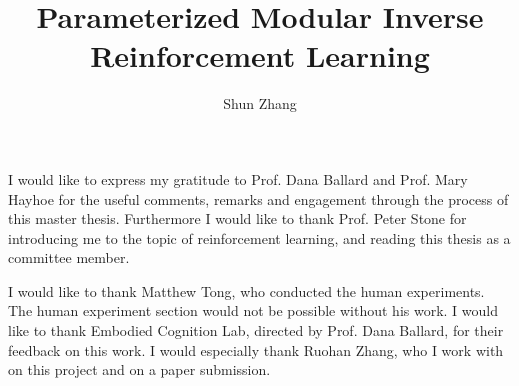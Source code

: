 \documentclass[12pt]{report}	%
\author{Shun Zhang}
\title{Parameterized Modular Inverse Reinforcement Learning}
\theoremstyle{definition}
\theoremstyle{remark}
\begin{document}
\copyrightpage          %


%
%
%
\titlepage              %

\commcertpage           %

%
\begin{acknowledgments}		%
%
I would like to express my gratitude to Prof. Dana Ballard and Prof. Mary Hayhoe
for the useful comments, remarks and engagement through the process of this
master thesis. Furthermore I would like to thank Prof. Peter Stone for
introducing me to the topic of reinforcement learning, and reading this thesis
as a committee member.

I would like to thank Matthew Tong, who conducted the human experiments. The
human experiment section would not be possible without his work. I would
like to thank Embodied Cognition Lab, directed by Prof. Dana Ballard, for their
feedback on this work. I would especially thank Ruohan Zhang, who I work with on
this project and on a paper submission.
\end{acknowledgments}
\end{document}
